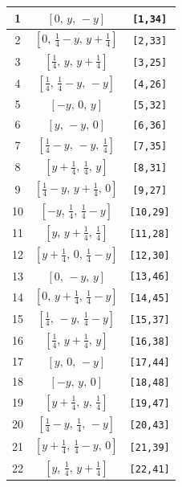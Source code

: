 \documentclass[fleqn,8pt]{jsarticle}
\begin{document}
\begin{longtable}{ccc}
1 & $\left[ 0,\, y,\, - y \right]$ & {\tt [1,34]} \\ \hline
2 & $\left[ 0,\, \frac{1}{4} - y,\, y + \frac{1}{4} \right]$ & {\tt [2,33]} \\ \hline
3 & $\left[ \frac{1}{4},\, y,\, y + \frac{1}{4} \right]$ & {\tt [3,25]} \\ \hline
4 & $\left[ \frac{1}{4},\, \frac{1}{4} - y,\, - y \right]$ & {\tt [4,26]} \\ \hline
5 & $\left[ - y,\, 0,\, y \right]$ & {\tt [5,32]} \\ \hline
6 & $\left[ y,\, - y,\, 0 \right]$ & {\tt [6,36]} \\ \hline
7 & $\left[ \frac{1}{4} - y,\, - y,\, \frac{1}{4} \right]$ & {\tt [7,35]} \\ \hline
8 & $\left[ y + \frac{1}{4},\, \frac{1}{4},\, y \right]$ & {\tt [8,31]} \\ \hline
9 & $\left[ \frac{1}{4} - y,\, y + \frac{1}{4},\, 0 \right]$ & {\tt [9,27]} \\ \hline
10 & $\left[ - y,\, \frac{1}{4},\, \frac{1}{4} - y \right]$ & {\tt [10,29]} \\ \hline
11 & $\left[ y,\, y + \frac{1}{4},\, \frac{1}{4} \right]$ & {\tt [11,28]} \\ \hline
12 & $\left[ y + \frac{1}{4},\, 0,\, \frac{1}{4} - y \right]$ & {\tt [12,30]} \\ \hline
13 & $\left[ 0,\, - y,\, y \right]$ & {\tt [13,46]} \\ \hline
14 & $\left[ 0,\, y + \frac{1}{4},\, \frac{1}{4} - y \right]$ & {\tt [14,45]} \\ \hline
15 & $\left[ \frac{1}{4},\, - y,\, \frac{1}{4} - y \right]$ & {\tt [15,37]} \\ \hline
16 & $\left[ \frac{1}{4},\, y + \frac{1}{4},\, y \right]$ & {\tt [16,38]} \\ \hline
17 & $\left[ y,\, 0,\, - y \right]$ & {\tt [17,44]} \\ \hline
18 & $\left[ - y,\, y,\, 0 \right]$ & {\tt [18,48]} \\ \hline
19 & $\left[ y + \frac{1}{4},\, y,\, \frac{1}{4} \right]$ & {\tt [19,47]} \\ \hline
20 & $\left[ \frac{1}{4} - y,\, \frac{1}{4},\, - y \right]$ & {\tt [20,43]} \\ \hline
21 & $\left[ y + \frac{1}{4},\, \frac{1}{4} - y,\, 0 \right]$ & {\tt [21,39]} \\ \hline
22 & $\left[ y,\, \frac{1}{4},\, y + \frac{1}{4} \right]$ & {\tt [22,41]} \\ \hline

\end{longtable}
\end{document}
